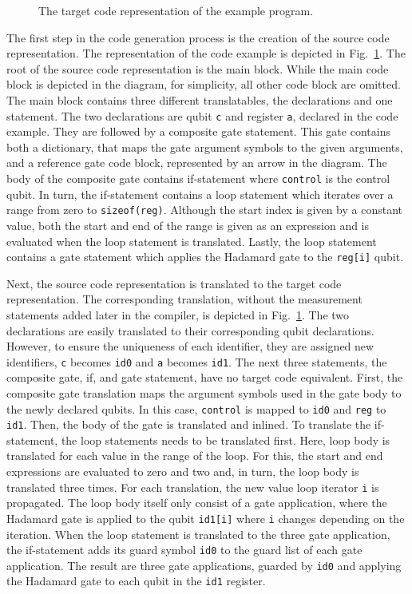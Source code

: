 \begin{figure}
\begin{minipage}{.45\textwidth}
        \caption{The target code representation of the example program.}    
        \label{fig:implementation_targetCodeRep_example}
    \end{minipage}
\end{figure}

The first step in the code generation process is the creation of the source code representation. The representation of the code example is depicted in Fig.~\ref{fig:implementation_targetCodeRep_example}. The root of the source code representation is the main block. While the main code block is depicted in the diagram, for simplicity, all other code block are omitted. The main block contains three different translatables, the declarations and one statement. The two declarations are qubit \texttt{c} and register \texttt{a}, declared in the code example. They are followed by a composite gate statement. This gate contains both a dictionary, that maps the gate argument symbols to the given arguments, and a reference gate code block, represented by an arrow in the diagram. The body of the composite gate contains if-statement where \texttt{control} is the control qubit. In turn, the if-statement contains a loop statement which iterates over a range from zero to \texttt{sizeof(reg)}. Although the start index is given by a constant value, both the start and end of the range is given as an expression and is evaluated when the loop statement is translated. Lastly, the loop statement contains a gate statement which applies the Hadamard gate to the \texttt{reg[i]} qubit.

Next, the source code representation is translated to the target code representation. The corresponding translation, without the measurement statements added later in the compiler, is depicted in Fig.~\ref{fig:implementation_targetCodeRep_example}. The two declarations are easily translated to their corresponding qubit declarations. However, to ensure the uniqueness of each identifier, they are assigned new identifiers, \texttt{c} becomes \texttt{id0} and \texttt{a} becomes \texttt{id1}. The next three statements, the composite gate, if, and gate statement, have no target code equivalent. First, the composite gate translation maps the argument symbols used in the gate body to the newly declared qubits. In this case, \texttt{control} is mapped to \texttt{id0} and \texttt{reg} to \texttt{id1}. Then, the body of the gate is translated and inlined. To translate the if-statement, the loop statements needs to be translated first. Here, loop body is translated for each value in the range of the loop. For this, the start and end expressions are evaluated to zero and two and, in turn, the loop body is translated three times. For each translation, the new value loop iterator \texttt{i} is propagated. The loop body itself only consist of a gate application, where the Hadamard gate is applied to the qubit \texttt{id1[i]} where \texttt{i} changes depending on the iteration. When the loop statement is translated to the three gate application, the if-statement adds its guard symbol \texttt{id0} to the guard list of each gate application. The result are three gate applications, guarded by \texttt{id0} and applying the Hadamard gate to each qubit in the \texttt{id1} register.


